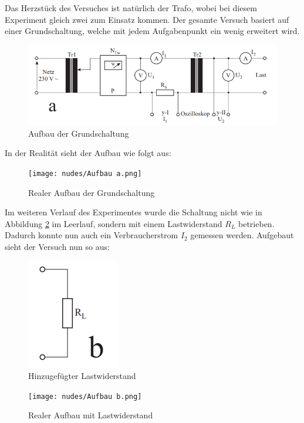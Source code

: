 \documentclass[12pt,a4paper,twoside]{article}
\begin{document}
Das Herzstück des Versuches ist natürlich der Trafo, wobei bei diesem Experiment gleich zwei zum Einsatz kommen. Der gesamte Versuch basiert auf einer Grundschaltung, welche mit jedem Aufgabenpunkt ein wenig erweitert wird.

    \begin{figure}[H]
        \centering
        \includegraphics[width=0.6\linewidth, angle=0]{nudes/Versuchsaufbau a.png}
        \caption{Aufbau der Grundschaltung}
        \label{fig:AufbauDerGrundschaltung}
    \end{figure}

\noindent
In der Realität sieht der Aufbau wie folgt aus:

\begin{figure}[H]
    \centering
    \texttt{[image: nudes/Aufbau a.png]}
    \caption{Realer Aufbau der Grundschaltung}
    \label{fig:RealerAufbauDerGrundschaltung}
\end{figure}

\noindent
Im weiteren Verlauf des Experimentes wurde die Schaltung nicht wie in Abbildung \ref{fig:RealerAufbauDerGrundschaltung} im Leerlauf, sondern mit einem Lastwiderstand $R_{L}$ betrieben. Dadurch konnte nun auch ein Verbraucherstrom $I_{2}$ gemessen werden. Aufgebaut sieht der Versuch nun so aus:

\begin{figure}[H]
    \centering
    \includegraphics[width=0.2\linewidth, angle=0]{nudes/Versuchsaufbau b.png}
    \caption{Hinzugefügter Lastwiderstand}
    \label{fig:AufbauB}
\end{figure}

\begin{figure}[H]
    \centering
    \texttt{[image: nudes/Aufbau b.png]}
    \caption{Realer Aufbau mit Lastwiderstand}
    \label{fig:RealerAufbauB}
\end{figure}
\end{document}
